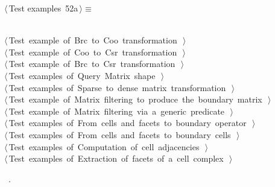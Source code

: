 \documentclass[11pt,oneside]{article}    %
\begin{document}
\begin{flushleft} \small \label{scrap83}
\protect{}$\langle\,$Test examples\nobreak\ {\footnotesize 52a}$\,\rangle\equiv$
\vspace{-1ex}
\begin{list}{}{} \item
\mbox{}\verb@@\\
\mbox{}\verb@@\hbox{$\langle\,$Test example of Brc to Coo transformation\nobreak\ {\footnotesize {}}$\,\rangle$}\verb@@\\
\mbox{}\verb@@\hbox{$\langle\,$Test example of Coo to Csr transformation\nobreak\ {\footnotesize {}}$\,\rangle$}\verb@@\\
\mbox{}\verb@@\hbox{$\langle\,$Test example of Brc to Csr transformation\nobreak\ {\footnotesize {}}$\,\rangle$}\verb@@\\
\mbox{}\verb@@\hbox{$\langle\,$Test examples of Query Matrix shape\nobreak\ {\footnotesize {}}$\,\rangle$}\verb@@\\
\mbox{}\verb@@\hbox{$\langle\,$Test examples of Sparse to dense matrix transformation\nobreak\ {\footnotesize {}}$\,\rangle$}\verb@@\\
\mbox{}\verb@@\hbox{$\langle\,$Test example of Matrix filtering to produce the boundary matrix\nobreak\ {\footnotesize {}}$\,\rangle$}\verb@@\\
\mbox{}\verb@@\hbox{$\langle\,$Test example of Matrix filtering via a generic predicate\nobreak\ {\footnotesize {}}$\,\rangle$}\verb@@\\
\mbox{}\verb@@\hbox{$\langle\,$Test examples of From cells and facets to boundary operator\nobreak\ {\footnotesize {}}$\,\rangle$}\verb@@\\
\mbox{}\verb@@\hbox{$\langle\,$Test examples of From cells and facets to boundary cells\nobreak\ {\footnotesize {}}$\,\rangle$}\verb@@\\
\mbox{}\verb@@\hbox{$\langle\,$Test examples of Computation of cell adjacencies\nobreak\ {\footnotesize {}}$\,\rangle$}\verb@@\\
\mbox{}\verb@@\hbox{$\langle\,$Test examples of Extraction of facets of a cell complex\nobreak\ {\footnotesize {}}$\,\rangle$}\verb@@\\
\mbox{}\verb@@{\NWsep}
\end{list}
\vspace{-1ex}
\footnotesize\addtolength{\baselineskip}{-1ex}
\begin{list}{}{\setlength{\itemsep}{-\parsep}\setlength{\itemindent}{-\leftmargin}}
\item \NWtxtMacroRefIn\ .
\end{list}
\end{flushleft}
\end{document}
